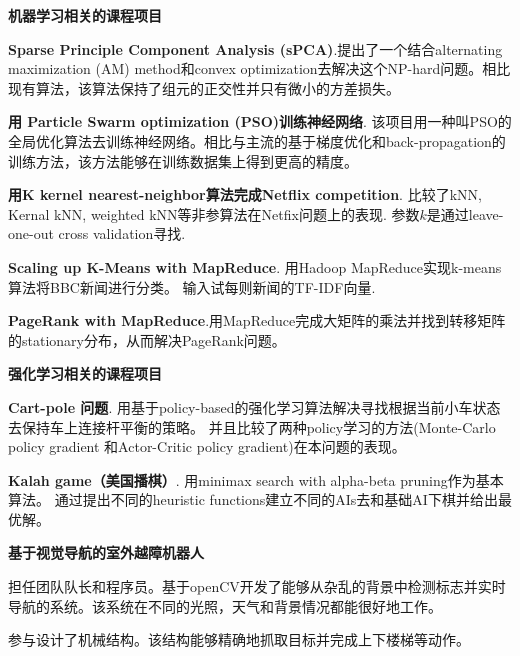 \documentclass[margin,line,11pt]{resume}
\begin{document}
\begin{resume}
\textbf{机器学习相关的课程项目}
\vspace{0.5 em}
\begin{list2}
\item \textbf{Sparse Principle Component Analysis (sPCA)}.提出了一个结合alternating maximization (AM) method和convex optimization去解决这个NP-hard问题。相比现有算法，该算法保持了组元的正交性并只有微小的方差损失。
\item \textbf{用 Particle Swarm optimization (PSO)训练神经网络}. 该项目用一种叫PSO的全局优化算法去训练神经网络。相比与主流的基于梯度优化和back-propagation的训练方法，该方法能够在训练数据集上得到更高的精度。
\item \textbf{用K kernel nearest-neighbor算法完成Netflix competition}. 比较了kNN, Kernal kNN, weighted kNN等非参算法在Netfix问题上的表现. 参数$k$是通过leave-one-out cross validation寻找. 
\item \textbf{Scaling up K-Means with MapReduce}. 用Hadoop MapReduce实现k-means算法将BBC新闻进行分类。 输入试每则新闻的TF-IDF向量.
\item \textbf{PageRank with MapReduce}.用MapReduce完成大矩阵的乘法并找到转移矩阵的stationary分布，从而解决PageRank问题。
\end{list2}


\textbf{强化学习相关的课程项目}
\vspace{0.5 em}
\begin{list2}        
\item \textbf{Cart-pole 问题}. 用基于policy-based的强化学习算法解决寻找根据当前小车状态去保持车上连接杆平衡的策略。 并且比较了两种policy学习的方法(Monte-Carlo policy gradient 和Actor-Critic policy gradient)在本问题的表现。
\item \textbf{Kalah game（美国播棋）}. 用minimax search with alpha-beta pruning作为基本算法。 通过提出不同的heuristic functions建立不同的AIs去和基础AI下棋并给出最优解。
\end{list2}



\textbf{基于视觉导航的室外越障机器人}
\begin{list2}
\item 担任团队队长和程序员。基于openCV开发了能够从杂乱的背景中检测标志并实时导航的系统。该系统在不同的光照，天气和背景情况都能很好地工作。
\item 参与设计了机械结构。该结构能够精确地抓取目标并完成上下楼梯等动作。
\end{list2}






    	

 	

 	       
\end{resume}   
\end{document}

